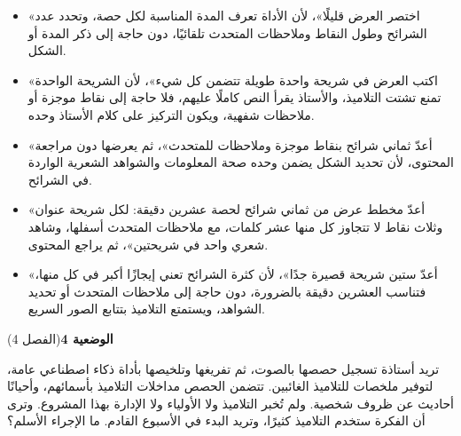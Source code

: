\documentclass[11pt,a4paper]{article}
\begin{document}
\begin{itemize}[leftmargin=1.0cm, labelsep=6pt, itemsep=3pt, topsep=4pt, parsep=0pt]
  \item[\textbf{أ)}] «اختصر العرض قليلًا»، لأن الأداة تعرف المدة المناسبة لكل حصة، وتحدد عدد الشرائح وطول النقاط وملاحظات المتحدث تلقائيًا، دون حاجة إلى ذكر المدة أو الشكل.
  \item[\textbf{ب)}] «اكتب العرض في شريحة واحدة طويلة تتضمن كل شيء»، لأن الشريحة الواحدة تمنع تشتت التلاميذ، والأستاذ يقرأ النص كاملًا عليهم، فلا حاجة إلى نقاط موجزة أو ملاحظات شفهية، ويكون التركيز على كلام الأستاذ وحده.
  \item[\textbf{ج)}] «أعدّ ثماني شرائح بنقاط موجزة وملاحظات للمتحدث»، ثم يعرضها دون مراجعة المحتوى، لأن تحديد الشكل يضمن وحده صحة المعلومات والشواهد الشعرية الواردة في الشرائح.
  \item[\textbf{د)}] «أعدّ مخطط عرض من ثماني شرائح لحصة عشرين دقيقة: لكل شريحة عنوان وثلاث نقاط لا تتجاوز كل منها عشر كلمات، مع ملاحظات المتحدث أسفلها، وشاهد شعري واحد في شريحتين»، ثم يراجع المحتوى.
  \item[\textbf{هـ)}] «أعدّ ستين شريحة قصيرة جدًا»، لأن كثرة الشرائح تعني إيجازًا أكبر في كل منها، فتناسب العشرين دقيقة بالضرورة، دون حاجة إلى ملاحظات المتحدث أو تحديد الشواهد، ويستمتع التلاميذ بتتابع الصور السريع.
\end{itemize}
\par\vspace{6pt}
\noindent
{\large\khatt\textbf{الوضعية 4}}\hfill{\small(الفصل 4)}\par\nopagebreak\vspace{3pt}
\setlength{\fboxsep}{7pt}\colorbox{gray!10}{\parbox{\dimexpr\linewidth-14pt}{تريد أستاذة تسجيل حصصها بالصوت، ثم تفريغها وتلخيصها بأداة ذكاء اصطناعي عامة، لتوفير ملخصات للتلاميذ الغائبين. تتضمن الحصص مداخلات التلاميذ بأسمائهم، وأحيانًا أحاديث عن ظروف شخصية. ولم تُخبر التلاميذ ولا الأولياء ولا الإدارة بهذا المشروع. وترى أن الفكرة ستخدم التلاميذ كثيرًا، وتريد البدء في الأسبوع القادم. ما الإجراء الأسلم؟}}\par\nopagebreak
\end{document}
